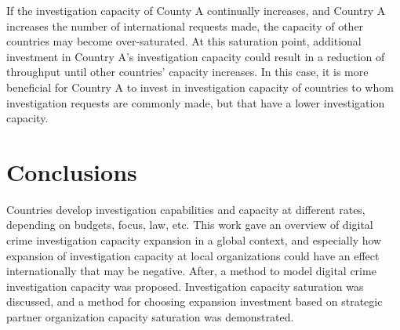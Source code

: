 \documentclass[10pt,a4paper]{article}
\begin{document}
If the investigation capacity of County A continually increases, and Country A increases the number of international requests made, the capacity of other countries may become over-saturated. At this saturation point, additional investment in Country A's investigation capacity could result in a reduction of throughput until other countries' capacity increases. In this case, it is more beneficial for Country A to invest in investigation capacity of countries to whom investigation requests are commonly made, but that have a lower investigation capacity.

\section{Conclusions}
Countries develop investigation capabilities and capacity at different rates, depending on budgets, focus, law, etc. This work gave an overview of digital crime investigation capacity expansion in a global context, and especially how expansion of investigation capacity at local organizations could have an effect internationally that may be negative. After, a method to model digital crime investigation capacity was proposed. Investigation capacity saturation was discussed, and a method for choosing expansion investment based on strategic partner organization capacity saturation was demonstrated.
\end{document}
